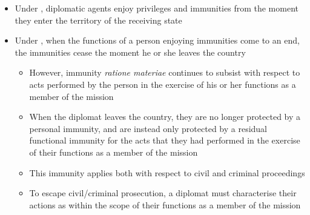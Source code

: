 \begin{itemize}
    \item Under , diplomatic agents enjoy privileges and immunities from the moment they enter the territory of the receiving state
    \item Under , when the functions of a person enjoying immunities come to an end, the immunities cease the moment he or she leaves the country
    \begin{itemize}
        \item However, immunity \textit{ratione materiae} continues to subsist with respect to acts performed by the person in the exercise of his or her functions as a member of the mission
        \item When the diplomat leaves the country, they are no longer protected by a personal immunity, and are instead only protected by a residual functional immunity for the acts that they had performed in the exercise of their functions as a member of the mission
        \item This immunity applies both with respect to civil and criminal proceedings
        \item To escape civil/criminal prosecution, a diplomat must characterise their actions as within the scope of their functions as a member of the mission
    \end{itemize}
\end{itemize}